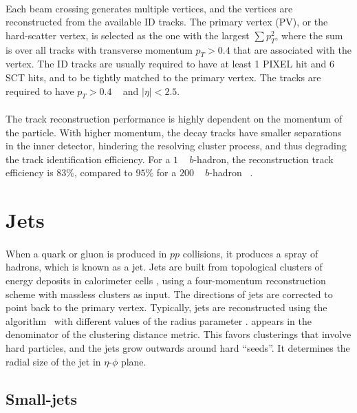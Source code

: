 \paragraph{}
Each beam crossing generates multiple vertices, and the vertices are reconstructed from the available ID tracks. 
The primary vertex (PV), or the hard-scatter vertex, is selected as the one with the largest $\sum p_T^2$, where the sum is over all tracks with transverse momentum $p_T > 0.4$ \GeV that are associated with the vertex.
The ID tracks are usually required to have at least 1 PIXEL hit and 6 SCT hits, and to be tightly matched to the primary vertex. 
The tracks are required to have $p_T > 0.4$ \GeV~ and $|\eta| < 2.5$.

\paragraph{}
The track reconstruction performance is highly dependent on the momentum of the particle. 
With higher momentum, the decay tracks have smaller separations in the inner detector, hindering the resolving cluster process, and thus degrading the track identification efficiency. 
For a $1$ \TeV~ $b$-hadron, the reconstruction track efficiency is $83\%$, compared to $95\%$ for a $200$ \GeV~ $b$-hadron ~\cite{Aaboud:2017all}.

\section{Jets}
\paragraph{}
When a quark or gluon is produced in $pp$ collisions, it produces a spray of hadrons, which is known as a jet. 
Jets are built from topological clusters of energy deposits in calorimeter cells \cite{PERF-2014-07}, using a four-momentum reconstruction scheme with massless clusters as input. 
The directions of jets are corrected to point back to the primary vertex.
Typically, jets are reconstructed using the \akt algorithm~\cite{AntiKt} with different values of the radius parameter \R.
\R appears in the denominator of the clustering distance metric. 
This favors clusterings that involve hard particles, and the jets grow outwards around hard ``seeds''.
It determines the radial size of the jet in $\eta$-$\phi$ plane.

\subsection{Small-\R jets}
